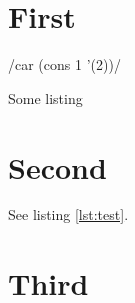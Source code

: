 \documentclass{article}
\begin{document}
\section{First}
\begin{listing}
  /car (cons 1 '(2))/
  \caption{Some listing}
  \label{lst:test}
\end{listing}

\section{Second}
See listing \ref{lst:test}.

\section{Third}
\listoflistings
\end{document}
